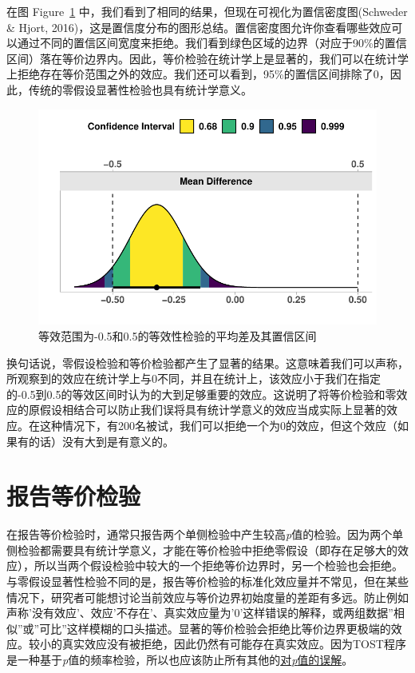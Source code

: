 \documentclass[
  letterpaper,
  DIV=11,
  numbers=noendperiod]{scrreprt}
\begin{document}
在图 Figure~\ref{fig-ciequivalence2}
中，我们看到了相同的结果，但现在可视化为置信密度图(Schweder \& Hjort,
2016)，这是置信度分布的图形总结。置信密度图允许你查看哪些效应可以通过不同的置信区间宽度来拒绝。我们看到绿色区域的边界（对应于90\%的置信区间）落在等价边界内。因此，等价检验在统计学上是显著的，我们可以在统计学上拒绝存在等价范围之外的效应。我们还可以看到，95\%的置信区间排除了0，因此，传统的零假设显著性检验也具有统计学意义。

\begin{figure}

{\centering \includegraphics[width=1\textwidth,height=\textheight]{09-equivalencetest_files/figure-pdf/fig-ciequivalence2-1.pdf}

}

\caption{\label{fig-ciequivalence2}等效范围为-0.5和0.5的等效性检验的平均差及其置信区间}

\end{figure}

换句话说，零假设检验和等价检验都产生了显著的结果。这意味着我们可以声称，所观察到的效应在统计学上与0不同，并且在统计上，该效应小于我们在指定的-0.5到0.5的等效区间时认为的大到足够重要的效应。这说明了将等价检验和零效应的原假设相结合可以防止我们误将具有统计学意义的效应当成实际上显著的效应。在这种情况下，有200名被试，我们可以拒绝一个为0的效应，但这个效应（如果有的话）没有大到是有意义的。

\hypertarget{ux62a5ux544aux7b49ux4ef7ux68c0ux9a8c}{%
\section{报告等价检验}\label{ux62a5ux544aux7b49ux4ef7ux68c0ux9a8c}}

在报告等价检验时，通常只报告两个单侧检验中产生较高\emph{p}值的检验。因为两个单侧检验都需要具有统计学意义，才能在等价检验中拒绝零假设（即存在足够大的效应），所以当两个假设检验中较大的一个拒绝等价边界时，另一个检验也会拒绝。与零假设显著性检验不同的是，报告等价检验的标准化效应量并不常见，但在某些情况下，研究者可能想讨论当前效应与等价边界初始度量的差距有多远。防止例如声称'没有效应'、效应'不存在'、真实效应量为'0'这样错误的解释，或两组数据''相似''或''可比''这样模糊的口头描述。显著的等价检验会拒绝比等价边界更极端的效应。较小的真实效应没有被拒绝，因此仍然有可能存在真实效应。因为TOST程序是一种基于\emph{p}值的频率检验，所以也应该防止所有其他的\protect\hyperlink{misconceptions}{对\emph{p}值的误解}。
\end{document}
